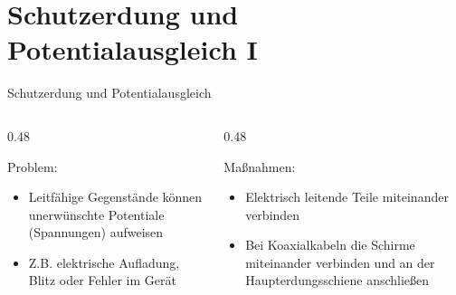 
\section{Schutzerdung und Potentialausgleich I}
\label{section:schutzerdung_1}
\begin{frame}{Schutzerdung und Potentialausgleich}
    \begin{columns}
        \begin{column}{0.48\textwidth}
            \begin{block}{Problem:}
                \begin{itemize}
                    \item Leitfähige Gegenstände können unerwünschte Potentiale (Spannungen) aufweisen
                    \item Z.B. elektrische Aufladung, Blitz oder Fehler im Gerät
                \end{itemize}
            \end{block}
        \end{column}
        \begin{column}{0.48\textwidth}
            \begin{block}{Maßnahmen:}
                \begin{itemize}
                    \item Elektrisch leitende Teile miteinander verbinden
                    \item Bei Koaxialkabeln die Schirme miteinander verbinden und an der Haupterdungsschiene anschließen
                \end{itemize}
            \end{block}
        \end{column}
    \end{columns}
\end{frame}

